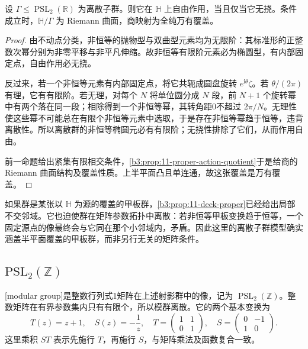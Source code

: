 \begin{corollary}[无挠离散群的商]\label{b3:cor:11-torsion-free-quotient}
设 \(\Gamma\le\operatorname{PSL}_2(\mathbb R)\) 为离散子群。则它在 \(\mathbb H\) 上自由作用，当且仅当它无挠。条件成立时，\(\mathbb H/\Gamma\) 为 Riemann 曲面，商映射为全纯万有覆盖。
\end{corollary}
\begin{proof}
由不动点分类，非恒等的抛物型与双曲型元素均为无限阶：其标准形的正整数次幂分别为非零平移与非平凡伸缩。故非恒等有限阶元素必为椭圆型，有内部固定点，自由作用必无挠。

反过来，若一个非恒等元素有内部固定点，将它共轭成圆盘旋转 \(e^{\mathrm{i}\theta}\zeta\)。若 \(\theta/(2\pi)\) 有理，它有有限阶。若无理，对每个 \(N\) 将单位圆分成 \(N\) 段，前 \(N+1\) 个旋转幂中有两个落在同一段；相除得到一个非恒等幂，其转角距0不超过 \(2\pi/N\)。无理性使这些幂不可能总在有限个非恒等元素中选取，于是存在非恒等幂趋于恒等，违背离散性。所以离散群的非恒等椭圆元必有有限阶；无挠性排除了它们，从而作用自由。

前一命题给出紧集有限相交条件，\cref{b3:prop:11-proper-action-quotient}于是给商的 Riemann 曲面结构及覆盖性质。上半平面凸且单连通，故这张覆盖是万有覆盖。
\end{proof}
如果群是某张以 \(\mathbb H\) 为源的覆盖的甲板群，\cref{b3:prop:11-deck-proper}已经给出局部不交邻域。它也迫使群在矩阵参数拓扑中离散：若非恒等甲板变换趋于恒等，一个固定源点的像最终会与它同在那个小邻域内，矛盾。因此这里的离散子群模型确实涵盖半平面覆盖的甲板群，而非另行无关的矩阵条件。

\subsection{\texorpdfstring{\(\mathrm{PSL}_2(\mathbb Z)\)}{PSL2(Z)}}
\label{b3:subsec:110404}

[modular group]是整数行列式1矩阵在上述射影群中的像，记为 \(\operatorname{PSL}_2(\mathbb Z)\)。整数矩阵在有界参数集内只有有限个，所以模群离散。它的两个基本变换为
\[
 T(z)=z+1,\quad S(z)=-\frac1z,\quad
 T=\begin{pmatrix}1&1\\0&1\end{pmatrix},\quad
 S=\begin{pmatrix}0&-1\\1&0\end{pmatrix}.
\]
这里乘积 \(ST\) 表示先施行 \(T\)，再施行 \(S\)，与矩阵乘法及函数复合一致。

